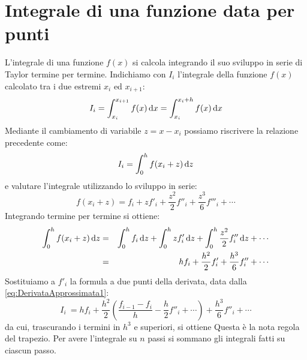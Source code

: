\section{Integrale di una funzione data per punti}

L'integrale di una funzione $f(x)$ si calcola integrando il suo
sviluppo in serie di Taylor termine per termine.
Indichiamo con $I_i$ l'integrale della funzione $f(x)$ calcolato tra i due
estremi $x_i$ ed $x_{i+1}$:
$$
I_i = \dintegral{f(x)}{x}{x_i}{x_{i+1}} = \dintegral{f(x)}{x}{x_i}{x_i + h}
$$
Mediante il cambiamento di variabile $z = x - x_i$ possiamo riscrivere
la relazione precedente come:
$$
I_i = \dintegral{f(x_i+z)}{z}{0}{h}
$$
e valutare l'integrale utilizzando lo sviluppo in serie:
$$
f(x_i+z) = f_i + z f'_i + \frac{z^2}{2}f''_i + \frac{z^3}{6}f'''_i + \cdots
$$
Integrando termine per termine si ottiene:
\begin{eqnarray*}
\dintegral{f(x_i+z)}{z}{0}{h} & = &
\dintegral{f_i}{z}{0}{h} + \dintegral{z f'_i}{z}{0}{h} +
\dintegral{\frac{z^2}{2}f''_i}{z}{0}{h} + \cdots\\
& = & h f_i+\frac{h^2}{2}f'_i+\frac{h^3}{6}f''_i+\cdots
\end{eqnarray*}
Sostituiamo a $f'_i$ la formula a due punti della derivata, data dalla
\ref{eq:DerivataApprossimata1}:
$$
I_i\ = h f_i+\frac{h^2}{2}\left (\frac{f_{i-1}-f_i}{h}-\frac{h}{2}f''_i+
\cdots\right)
+\frac{h^3}{6}f''_i+\cdots$$
da cui, trascurando i termini in $h^3$ e superiori, si ottiene
Questa \`e la nota regola del trapezio. Per avere l'integrale su $n$ passi
si sommano gli integrali fatti su ciascun passo.

